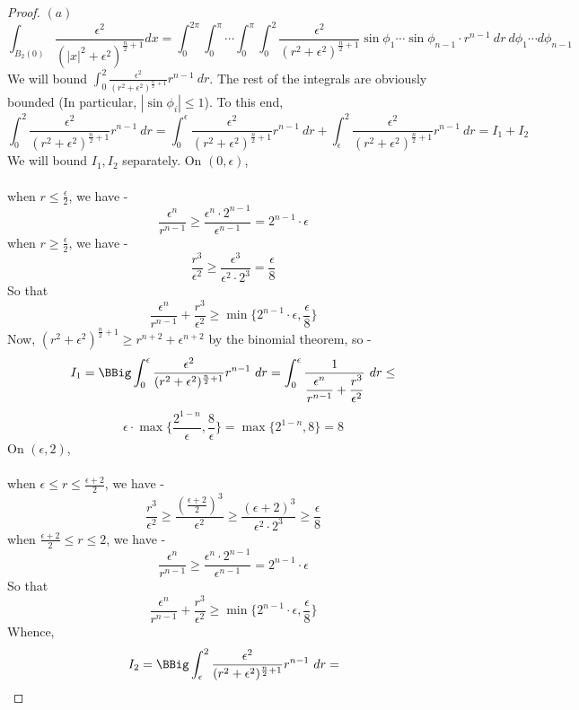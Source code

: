 \documentclass[12pt]{article}
\begin{document}
\begin{proof}
  $(a)$
  $$
    \int_{B_2(0)} \dfrac{\epsilon^2}{(|x|^2+\epsilon^2)^{\frac{n}{2}+1}} dx =
    \int_0^{2\pi} \int_0^\pi \cdots \int_0^\pi \int_0^2 \dfrac{\epsilon^2}{(r^2+\epsilon^2)^{\frac{n}{2}+1}} \sin\phi_1 \cdots \sin\phi_{n-1} \cdot r^{n-1}\ dr\ d\phi_1 \cdots d\phi_{n-1}
  $$
  We will bound $\int_0^2 \frac{\epsilon^2}{(r^2+\epsilon^2)^{\frac{n}{2}+1}} r^{n-1}\ dr$. The rest of the integrals are obviously bounded (In particular, $|\sin \phi_i| \le 1$). To this end,
  $$
    \int_0^2 \frac{\epsilon^2}{(r^2+\epsilon^2)^{\frac{n}{2}+1}} r^{n-1}\ dr =
    \int_0^\epsilon \frac{\epsilon^2}{(r^2+\epsilon^2)^{\frac{n}{2}+1}} r^{n-1}\ dr +
    \int_\epsilon^2 \frac{\epsilon^2}{(r^2+\epsilon^2)^{\frac{n}{2}+1}} r^{n-1}\ dr =
    I_1 + I_2
  $$
  We will bound $I_1, I_2$ separately. On $(0, \epsilon)$,
  \\
  \\
  when $r \le \frac{\epsilon}{2}$, we have -
  $$
    \dfrac{\epsilon^n}{r^{n-1}} \ge
    \dfrac{\epsilon^n \cdot 2^{n-1}}{\epsilon^{n-1}} =
    2^{n-1} \cdot \epsilon
  $$
  when $r \ge \frac{\epsilon}{2}$, we have -
  $$
    \dfrac{r^3}{\epsilon^2} \ge
    \dfrac{\epsilon^3}{\epsilon^2 \cdot  2^3} =
    \dfrac{\epsilon}{8}
  $$
  So that
  $$
    \dfrac{\epsilon^n}{r^{n-1}} + \dfrac{r^3}{\epsilon^2} \ge
    \min\{2^{n-1} \cdot \epsilon, \dfrac{\epsilon}{8}\}
  $$
  Now, $(r^2+\epsilon^2)^{\frac{n}{2}+1} \ge r^{n+2} + \epsilon^{n+2}$ by the binomial theorem, so -
  $$
    I_1 = \BBig\int_0^\epsilon \frac{\epsilon^2}{(r^2+\epsilon^2)^{\frac{n}{2}+1}} r^{n-1}\ dr =
    \int_0^\epsilon \frac{1}{\dfrac{\epsilon^n}{r^{n-1}} + \dfrac{r^3}{\epsilon^2}}\ dr \le
  $$
  $$
    \epsilon \cdot \max\{ \frac{2^{1-n}}{\epsilon}, \frac{8}{\epsilon} \} =
    \max\{ 2^{1-n}, 8 \} =
    8
  $$
  On $(\epsilon, 2)$,
  \\
  \\
  when $\epsilon \le r \le \frac{\epsilon+2}{2}$, we have -
  $$
    \dfrac{r^3}{\epsilon^2} \ge
    \dfrac{(\frac{\epsilon+2}{2})^3}{\epsilon^2} \ge
    \dfrac{(\epsilon+2)^3}{\epsilon^2 \cdot 2^3} \ge
    \dfrac{\epsilon}{8}
  $$
  when $\frac{\epsilon+2}{2} \le r \le 2$, we have -
  $$
    \dfrac{\epsilon^n}{r^{n-1}} \ge
    \dfrac{\epsilon^n \cdot 2^{n-1}}{\epsilon^{n-1}} =
    2^{n-1} \cdot \epsilon
  $$
  So that
  $$
    \dfrac{\epsilon^n}{r^{n-1}} + \dfrac{r^3}{\epsilon^2} \ge
    \min\{2^{n-1} \cdot \epsilon, \dfrac{\epsilon}{8}\}
  $$
  Whence,
  $$
    I_2 = \BBig\int_\epsilon^2 \frac{\epsilon^2}{(r^2+\epsilon^2)^{\frac{n}{2}+1}} r^{n-1}\ dr =
$$
\end{proof}
\end{document}
